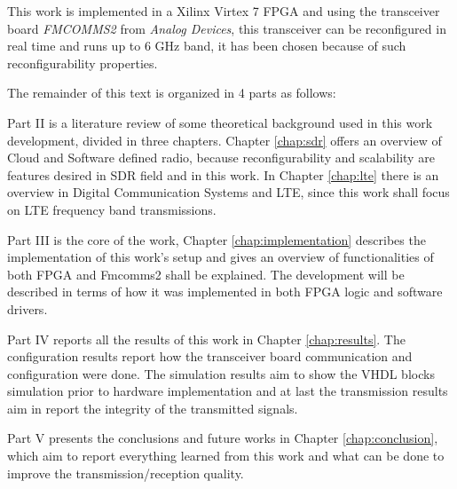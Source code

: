 This work is implemented in a Xilinx Virtex 7 FPGA and using the transceiver
board \textit{FMCOMMS2} from \textit{Analog Devices}, this transceiver can be
reconfigured in real time and runs up to 6 GHz band, it has been chosen because
of such reconfigurability properties.

The remainder of this text is organized in 4 parts as follows:

Part II is a literature review of some theoretical background used in this work
development, divided in three chapters. Chapter \ref{chap:sdr} offers an
overview of Cloud and Software defined radio, because reconfigurability and
scalability are features desired in SDR field and in this work. In Chapter
\ref{chap:lte} there is an overview in Digital Communication Systems and LTE,
since this work shall focus on LTE  frequency band transmissions.

Part III is the core of the work, Chapter \ref{chap:implementation} describes
the implementation of this work's setup and gives an overview of functionalities
of both FPGA and Fmcomms2 shall be explained. The development will be described
in terms of how it was implemented in both FPGA logic and software drivers.

Part IV reports all the results of this work in Chapter
\ref{chap:results}. The configuration results report how the transceiver board
communication and configuration were done. The simulation results aim to show
the VHDL blocks simulation prior to hardware implementation and at last the
transmission results aim in report the integrity of the transmitted signals.

Part V presents the conclusions and future works in Chapter
\ref{chap:conclusion}, which aim to report everything learned from this work and
what can be done to improve the transmission/reception quality.
